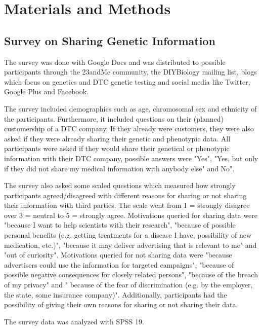\documentclass[10pt]{article}
\begin{document}
\section*{Materials and Methods}
\subsection*{Survey on Sharing Genetic Information}
The survey was done with Google Docs and was distributed to possible participants through the 23andMe community, the DIYBiology mailing list, blogs which focus on genetics and DTC genetic testing and social media like Twitter, Google Plus and Facebook.  

The survey included demographics such as age, chromosomal sex and ethnicity of the participants. Furthermore, it included questions on their (planned) customership of a DTC company. If they already were customers, they were also asked if they were already sharing their genetic and phenotypic data. All participants were asked if they would share their genetical or phenotypic information with their DTC company, possible answers were "Yes", "Yes, but only if they did not share my medical information with anybody else" and No".

The survey also asked some scaled questions which measured how strongly participants agreed/disagreed with different reasons for sharing or not sharing their information with third parties. The scale went from 1 = strongly disagree over 3 = neutral to  5 = strongly agree. Motivations queried for sharing data were "because I want to help scientists with their research", "because of possible personal benefits (e.g. getting treatments for a disease I have, possibility of new medication, etc.)", "because it may deliver advertising that is relevant to me" and "out of curiosity". Motivations queried for not sharing data were "because advertisers could use the information for targeted campaigns", "because of possible negative consequences for closely related persons", "because of the breach of my privacy" and " because of the fear of discrimination (e.g. by the employer, the state, some insurance company)". Additionally, participants had the possibility of giving their own reasons for sharing or not sharing their data.

The survey data was analyzed with SPSS 19. 
\end{document}
